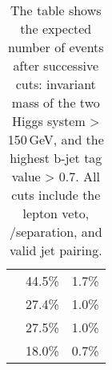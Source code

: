 \begin{table}[!tbp]
\begin{tabular}{lrr}
\gammagamma{\Pphoton}{\BS}{\Pphoton}{\BS}{ \Pquark \Pquark \Pquark \Pquark}& 44.5\%& 1.7\%\\
\gammagamma{\Pphoton}{\BS}{\Pphoton}{\EPA}{ \Pquark \Pquark \Pquark \Pquark}& 27.4\%& 1.0\%\\
\gammagamma{\Pphoton}{\EPA}{\Pphoton}{\BS}{ \Pquark \Pquark \Pquark \Pquark}& 27.5\%& 1.0\%\\
\gammagamma{\Pphoton}{\EPA}{\Pphoton}{\EPA}{ \Pquark \Pquark \Pquark \Pquark} & 18.0\% & 0.7\%\\
\hline \hline
\end{tabular}
\caption
{The table shows the expected number of events after successive cuts: invariant mass of the two Higgs system > 150\,GeV, and the highest b-jet tag value > 0.7. All cuts include the lepton veto, \eeToHHbbWW/\eeToHHbbbb separation, and valid jet pairing. \HiggsTableHigh
}
\label{tab:doubleHiggs3TeVPreslectionPart2}
\end{table}


%
